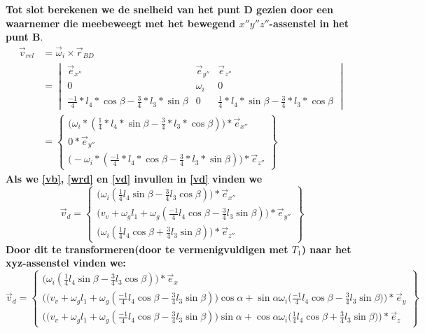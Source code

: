 \documentclass[a4paper,10pt]{article}
\begin{document}
\textbf{Tot slot berekenen we de snelheid van het punt D gezien door een waarnemer die meebeweegt met het bewegend $x''y''z''$-assenstel in het punt B}.\\
\begin{equation}
\label{vrel}
\begin{aligned}
\vec{v}_{rel} &= \vec{\omega}_i \times \vec{r}_{BD} \\
&=\begin{vmatrix}
\vec{e}_{x''} & \vec{e}_{y''} & \vec{e}_{z''}\\
0 & \omega_i & 0 \\
\frac{-1}{4}*l_4*\cos{\beta} - \frac{3}{4}*l_3 * \sin{\beta} & 0 &\frac{1}{4}*l_4 *\sin{\beta}-\frac{3}{4}*l_3 * \cos{\beta}
\end{vmatrix}\\
&= \begin{Bmatrix}
\Big(\omega_i * (\frac{1}{4}*l_4 *\sin{\beta}-\frac{3}{4}*l_3 * \cos{\beta})\Big) * \vec{e}_{x''}\\
0 *\vec{e}_{y''}\\
\Big(-\omega_i *(\frac{-1}{4}*l_4*\cos{\beta} - \frac{3}{4}*l_3 * \sin{\beta}) \Big)*\vec{e}_{z''}
\end{Bmatrix}
\end{aligned}
\end{equation}
\textbf{Als we \eqref{vb}, \eqref{wrd} en \eqref{vd} invullen in \eqref{vd} vinden we}\\
\begin{equation}
\vec{v}_d = \begin{Bmatrix}
\Big(\omega_i (\frac{1}{4} l_4 \sin{\beta}-\frac{3}{4} l_3  \cos{\beta})\Big) * \vec{e}_{x''}\\
\Big(v_v + \omega_g  l_1 + \omega_g (\frac{-1}{4} l_4 \cos{\beta}-\frac{3}{4} l_3 \sin{\beta}) \Big) *\vec{e}_{y''}\\
\Big(\omega_i (\frac{1}{4} l_4 \cos{\beta} + \frac{3}{4} l_3  \sin{\beta}) \Big)*\vec{e}_{z''}
\end{Bmatrix}
\end{equation}
\textbf{Door dit te transformeren(door te vermenigvuldigen met $T_1$) naar het xyz-assenstel vinden we:} \\
\begin{equation}
\vec{v}_d = \begin{Bmatrix}
\Big(\omega_i  (\frac{1}{4}l_4 \sin{\beta}-\frac{3}{4}l_3  \cos{\beta})\Big) * \vec{e}_{x}\\
\Big(\big(v_v + \omega_g  l_1 + \omega_g(\frac{-1}{4} l_4 \cos{\beta}-\frac{3}{4} l_3 \sin{\beta}) \big) \cos{\alpha}  + \sin{\alpha}  \omega_i  \big( \frac{-1}{4}l_4 \cos{\beta} - \frac{3}{4}l_3 \sin{\beta}\big)\Big)*\vec{e}_{y} \\
\Big(\big(v_v + \omega_g   l_1 + \omega_g (\frac{-1}{4} l_4 \cos{\beta}-\frac{3}{4} l_3 \sin{\beta}) \big) \sin{\alpha}  + \cos{\alpha}  \omega_i   \big( \frac{1}{4} l_4 \cos{\beta} + \frac{3}{4}l_3 \sin{\beta}\big)\Big)*\vec{e}_{z}
\end{Bmatrix}
\end{equation}\\
\end{document}
